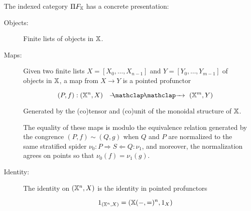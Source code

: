 \begin{lemma}
The indexed category $\Pi F_{\mathbb{X}}$ has a concrete presentation:

\begin{description}
\item[Objects:] Finite lists of objects in $\mathbb{X}$.
%
%
%

\item[Maps:] Given two finite lists $X=[X_0,\ldots, X_{n-1}]$ and $Y=[Y_0,\ldots, Y_{m-1}]$ of objects in $\mathbb{X}$, a map from $X\to Y$ is a pointed profunctor

$$
(P,f): (\X^n,X) \proarrow (\X^m,Y)
$$

Generated by the (co)tensor and (co)unit of the monoidal structure of $\mathbb{X}$.

The equality of these maps is modulo the equivalence relation generated by the congrence
$(P,f)\sim(Q,g)$
 when $Q$ and $P$ are normalized to the same stratified spider $\nu_0:P\Rightarrow S \Leftarrow Q:\nu_1$, and moreover, the normalization agrees on points so that $\nu_0(f)=\nu_1(g)$.
%

\item[Identity:]  The identity on $(\mathbb{X}^n,X)$ is the identity in pointed profunctors

$$
1_{(\mathbb{X}^n,X)} = (\mathbb{X}(-,=)^n,1_X)
$$



\end{description}
\end{lemma}
